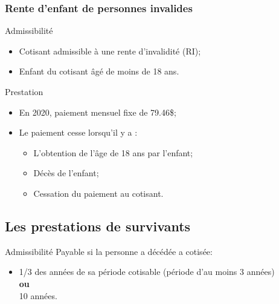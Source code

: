 \documentclass[10pt, french]{article}
\begin{document}
\begin{multicols*}{3}
\subsubsection*{Rente d'enfant de personnes invalides}

\begin{conceptgen}{Admissibilité}
\begin{itemize}[leftmargin = *]
	\item	Cotisant admissible à une rente d'invalidité (RI);
	\item	Enfant du cotisant âgé de moins de 18 ans.
\end{itemize}
\end{conceptgen}

\begin{conceptgen}{Prestation}
\begin{itemize}[leftmargin = *]
	\item	En 2020, paiement mensuel fixe de 79.46\$;
	\item	Le paiement cesse lorsqu'il y a :
		\begin{itemize}[leftmargin = *]
		\item	L'obtention de l'âge de 18 ans par l'enfant;
		\item	Décès de l'enfant;
		\item	Cessation du paiement au cotisant.
		\end{itemize}
\end{itemize}
\end{conceptgen}

\columnbreak

\subsection*{Les prestations de survivants}

\begin{conceptgen}{Admissibilité}
Payable si la personne a décédée a cotisée:
\begin{itemize}[leftmargin = *]
	\item	1/3 des années de sa période cotisable (période d'au moins 3 années)	\\
			\textbf{ou}	\\
			10 années.
\end{itemize}
\end{conceptgen}


\end{multicols*}
\end{document}

